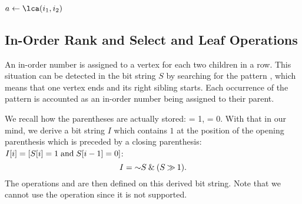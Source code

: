 \begin{algorithm}
\begin{algorithmic}
	\State $a \gets \lca(i_1, i_2)$
	\State {}
\EndFunction
\end{algorithmic}
\end{algorithm}

\begin{algorithm}
\begin{algorithmic}
	\State {}
\EndFunction
\end{algorithmic}
\end{algorithm}

\begin{algorithm}
\begin{algorithmic}
	\State {}
\EndFunction
\end{algorithmic}
\end{algorithm}

\subsection{In-Order Rank and Select and Leaf Operations}

An in-order number is assigned to a vertex for each two children in a row.
This situation can be detected in the bit string $S$ by searching for the pattern \str{)(}, which means that one vertex ends and its right sibling starts.
Each occurrence of the pattern is accounted as an in-order number being assigned to their parent.

We recall how the parentheses are actually stored: \openingParen = 1, \closingParen = 0.
With that in our mind, we derive a bit string $I$ which contains $1$ at the position of the opening parenthesis which is preceded by a closing parenthesis: $I[i] = [S[i] = 1 \mathrel{\textrm{and}} S[i-1] = 0]$:
$$ I = \mathord{\sim} S \mathbin{\&} (S \mathbin{\gg} 1). $$
The operations \inRank{} and \inSelect{} are then defined on this derived bit string.
Note that we cannot use the operation \degree{} since it is not supported.

\begin{algorithm}
\begin{algorithmic}
		\State {}
	\Else
		\State {}
	\EndIf
\EndFunction
\end{algorithmic}
\end{algorithm}

